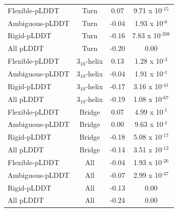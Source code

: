 \begin{table}[H]
\begin{tabular}{@{}lccc@{}}
Flexible-pLDDT                      & Turn                & 0.07                        & 9.71 x 10$^{\text{-15}}$     \\
Ambiguous-pLDDT                      & Turn                & -0.04                       & 1.93 x 10$^{\text{-6}}$      \\
Rigid-pLDDT                     & Turn                & -0.16                       & 7.83 x 10$^{\text{-208}}$    \\
All pLDDT                      & Turn                & -0.20                       & 0.00                         \\
\arrayrulecolor[gray]{0.8}\hline
Flexible-pLDDT                      & 3$_{10}$-helix      & 0.13                        & 1.28 x 10$^{\text{-3}}$      \\
Ambiguous-pLDDT                      & 3$_{10}$-helix      & -0.04                       & 1.91 x 10$^{\text{-1}}$      \\
Rigid-pLDDT                     & 3$_{10}$-helix      & -0.17                       & 3.16 x 10$^{\text{-41}}$     \\
All pLDDT                      & 3$_{10}$-helix      & -0.19                       & 1.08 x 10$^{\text{-67}}$     \\
\arrayrulecolor[gray]{0.8}\hline
Flexible-pLDDT                      & Bridge              & 0.07                        & 4.99 x 10$^{\text{-1}}$      \\
Ambiguous-pLDDT                      & Bridge              & 0.00                        & 9.63 x 10$^{\text{-1}}$      \\
Rigid-pLDDT                     & Bridge              & -0.18                       & 5.08 x 10$^{\text{-17}}$     \\
All pLDDT                      & Bridge              & -0.14                       & 3.51 x 10$^{\text{-12}}$     \\
\arrayrulecolor[gray]{0.8}\hline
Flexible-pLDDT                      & All                 & -0.04                       & 1.93 x 10$^{\text{-26}}$     \\
Ambiguous-pLDDT                      & All                 & -0.07                       & 2.99 x 10$^{\text{-47}}$     \\
Rigid-pLDDT                     & All                 & -0.13                       & 0.00                         \\
All pLDDT                      & All                 & -0.24                       & 0.00                                          \\ \bottomrule
\end{tabular}
\end{table}


